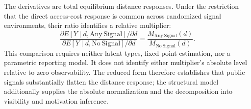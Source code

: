 \documentclass[12pt]{article}
\begin{document}
The derivatives are total equilibrium distance responses. Under the
restriction that the direct access-cost response is common across randomized
signal environments, their ratio identifies a relative multiplier:
\[
  \frac{\partial E[Y\mid d,\mathrm{Any\ Signal}]/\partial d}
       {\partial E[Y\mid d,\mathrm{No\ Signal}]/\partial d}
  =
  \frac{M_{\mathrm{Any\ Signal}}(d)}
       {M_{\mathrm{No\ Signal}}(d)}.
\]
This comparison requires neither latent types, fixed-point estimation, nor a
parametric reporting model. It does not identify either multiplier's absolute
level relative to zero observability. The reduced form therefore establishes
that public signals substantially flatten the distance response; the
structural model additionally supplies the absolute normalization and the
decomposition into visibility and motivation inference.
\end{document}

